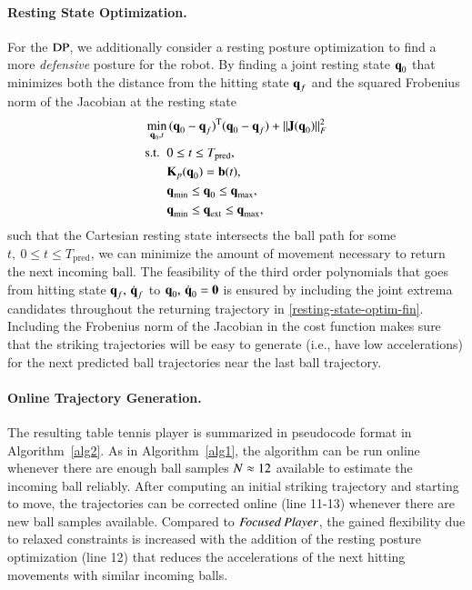 \paragraph{\textbf{Resting State Optimization}.} For the $\mathrm{DP}$, we additionally consider a resting posture optimization to find a more \emph{defensive} posture for the robot. By finding a joint resting state $\boldsymbol{\mathrm{q}}_0$ that minimizes both the distance from the hitting state $\boldsymbol{\mathrm{q}}_f$ and the squared Frobenius norm of the Jacobian at the resting state
%
\begin{align}
\min_{\boldsymbol{\mathrm{q}}_0,t} & \, (\boldsymbol{\mathrm{q}}_0 - \boldsymbol{\mathrm{q}}_f)^{\mathrm{T}}(\boldsymbol{\mathrm{q}}_0 - \boldsymbol{\mathrm{q}}_f) + \|\boldsymbol{\mathrm{J}}(\boldsymbol{\mathrm{q}}_0)\|_{F}^{2} \label{resting-state-optim-cost} \\
\textrm{s.t. \ } 
& 0 \leq t \leq T_{\mathrm{pred}}, \\
& \boldsymbol{\mathrm{K}}_p(\boldsymbol{\mathrm{q}}_0) = \boldsymbol{\mathrm{b}}(t), \label{resting-state-optim-limfin} \\ 
& \boldsymbol{\mathrm{q}}_{\mathrm{min}} \leq \boldsymbol{\mathrm{q}}_0 \leq \boldsymbol{\mathrm{q}}_{\mathrm{max}}, \label{resting-state-optim-limtraj} \\
& \boldsymbol{\mathrm{q}}_{\mathrm{min}} \leq \boldsymbol{\mathrm{q}}_{\mathrm{ext}} \leq \boldsymbol{\mathrm{q}}_{\mathrm{max}}, \label{resting-state-optim-fin}
\end{align}
%
\noindent such that the Cartesian resting state intersects the ball path for some $t, \ 0 \leq t \leq T_{\mathrm{pred}}$, we can minimize the amount of movement necessary to return the next incoming ball. The feasibility of the third order polynomials that goes from hitting state $\boldsymbol{\mathrm{q}}_f, \, \dot{\boldsymbol{\mathrm{q}}}_f$ to $\boldsymbol{\mathrm{q}}_0, \, \dot{\boldsymbol{\mathrm{q}}}_0 = \boldsymbol{\mathrm{0}}$ is ensured by including the joint extrema candidates throughout the returning trajectory in \eqref{resting-state-optim-fin}. Including the Frobenius norm of the Jacobian in the cost function makes sure that the striking trajectories will be easy to generate (i.e., have low accelerations) for the next predicted ball trajectories near the last ball trajectory.

\paragraph{\textbf{Online Trajectory Generation}.} The resulting table tennis player is summarized in pseudocode format in Algorithm~\ref{alg2}. As in Algorithm~\ref{alg1}, the algorithm can be run online whenever there are enough ball samples $N \approx 12$ available to estimate the incoming ball reliably. After computing an initial striking trajectory and starting to move, the trajectories can be corrected online (line 11-13) whenever there are new ball samples available. Compared to $\emph{Focused Player}$, the gained flexibility due to relaxed constraints is increased with the addition of the resting posture optimization (line 12) that reduces the accelerations of the next hitting movements with similar incoming balls. %

